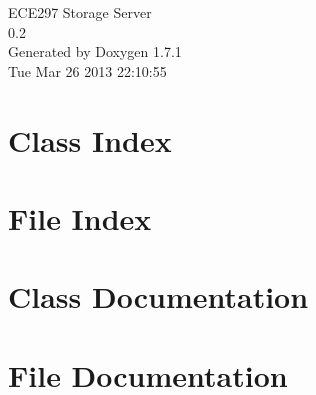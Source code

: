 \documentclass[letterpaper]{book}
\begin{document}
\hypersetup{pageanchor=false}
\begin{titlepage}
\vspace*{7cm}
\begin{center}
{\Large ECE297 Storage Server \\[1ex]\large 0.2 }\\
\vspace*{1cm}
{\large Generated by Doxygen 1.7.1}\\
\vspace*{0.5cm}
{\small Tue Mar 26 2013 22:10:55}\\
\end{center}
\end{titlepage}
\clearemptydoublepage
{}
\tableofcontents
\clearemptydoublepage
{}
\hypersetup{pageanchor=true}
\chapter{Class Index}

\chapter{File Index}

\chapter{Class Documentation}











\chapter{File Documentation}










\printindex
\end{document}
